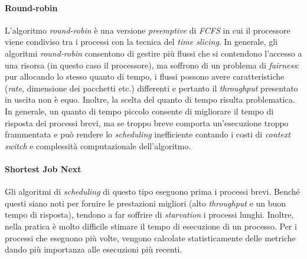 \paragraph{Round-robin}
L'algoritmo \textit{round-robin} è una versione \textit{preemptive} di \textit{FCFS} in cui il processore viene condiviso tra i processi con la tecnica del \textit{time slicing}. In generale, gli algoritmi \textit{round-robin} consentono di gestire più flussi che si contendono l'accesso a una risorsa (in questo caso il processore), ma soffrono di un problema di \textit{fairness}: pur allocando lo stesso quanto di tempo, i flussi possono avere caratteristiche (\textit{rate}, dimensione dei pacchetti etc.) differenti e pertanto il \textit{throughput} presentato in uscita non è equo. Inoltre, la scelta del quanto di tempo risulta problematica. In generale, un quanto di tempo piccolo consente di migliorare il tempo di risposta dei processi brevi, ma se troppo breve comporta un'esecuzione troppo frammentata e può rendere lo \textit{scheduling} inefficiente contando i costi di \textit{context switch} e complessità computazionale dell'algoritmo.

\paragraph{Shortest Job Next}
Gli algoritmi di \textit{scheduling} di questo tipo eseguono prima i processi brevi. Benché questi siano noti per fornire le prestazioni migliori (alto \textit{throughput} e un buon tempo di risposta), tendono a far soffrire di \textit{starvation} i processi lunghi. Inoltre, nella pratica è molto difficile stimare il tempo di esecuzione di un processo. Per i processi che eseguono più volte, vengono calcolate statisticamente delle metriche dando più importanza alle esecuzioni più recenti.

